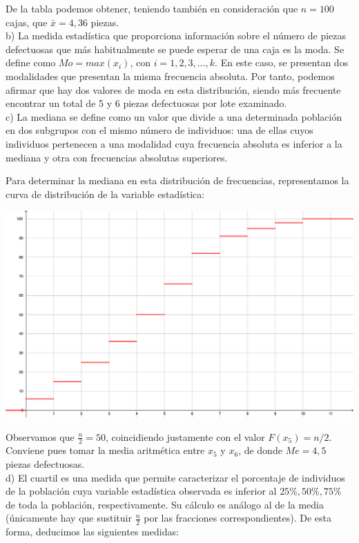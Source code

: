 De la tabla podemos obtener, teniendo también en consideración que $n=100$ cajas, que $\bar{x} = 4,36$ piezas. \\

b) La medida estadística que proporciona información sobre el número de piezas defectuosas que más habitualmente se puede esperar de una caja es la moda. Se define como $Mo = max(x_{i})$, con $i=1,2,3,...,k$. En este caso, se presentan dos modalidades que presentan la misma frecuencia absoluta. Por tanto, podemos afirmar que hay dos valores de moda en esta distribución, siendo más frecuente encontrar un total de 5 y 6 piezas defectuosas por lote examinado. \\

c) La mediana se define como un valor que divide a una determinada población en dos subgrupos con el mismo número de individuos: una de ellas cuyos individuos pertenecen a una modalidad cuya frecuencia absoluta es inferior a la mediana y otra con frecuencias absolutas superiores.

Para determinar la mediana en esta distribución de frecuencias, representamos la curva de distribución de la variable estadística: 

\begin{center}
	\includegraphics[scale=.35]{ejercicio-4-grafica.pdf}
\end{center}

Observamos que $\frac{n}{2} = 50$, coincidiendo justamente con el valor $F(x_{5}) = n/2$. Conviene pues tomar la media aritmética entre $x_{5}$ y $x_{6}$, de donde $Me = 4,5$ piezas defectuosas. \\

d) El cuartil es una medida que permite caracterizar el porcentaje de individuos de la población cuya variable estadística observada es inferior al $25\%, 50\%, 75\%$ de toda la población, respectivamente. Su cálculo es análogo al de la media (únicamente hay que sustituir $\frac{n}{2}$ por las fracciones correspondientes). De esta forma, deducimos las siguientes medidas:

